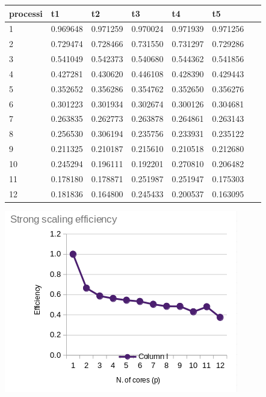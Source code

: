 \documentclass[a4paper,11pt, twoside]{report}
\begin{document}
\begin{table}[!ht]
    \centering
    \begin{tabular}{|l|l|l|l|l|l|l|}
    \hline
        processi & t1 & t2 & t3 & t4 & t5 & ~ \\ \hline
        1 & 0.969648 & 0.971259 & 0.970024 & 0.971939 & 0.971256 & ~ \\ \hline
        2 & 0.729474 & 0.728466 & 0.731550 & 0.731297 & 0.729286 & ~ \\ \hline
        3 & 0.541049 & 0.542373 & 0.540680 & 0.544362 & 0.541856 & ~ \\ \hline
        4 & 0.427281 & 0.430620 & 0.446108 & 0.428390 & 0.429443 & ~ \\ \hline
        5 & 0.352652 & 0.356286 & 0.354762 & 0.352650 & 0.356276 & ~ \\ \hline
        6 & 0.301223 & 0.301934 & 0.302674 & 0.300126 & 0.304681 & ~ \\ \hline
        7 & 0.263835 & 0.262773 & 0.263878 & 0.264861 & 0.263143 & ~ \\ \hline
        8 & 0.256530 & 0.306194 & 0.235756 & 0.233931 & 0.235122 & ~ \\ \hline
        9 & 0.211325 & 0.210187 & 0.215610 & 0.210518 & 0.212680 & ~ \\ \hline
        10 & 0.245294 & 0.196111 & 0.192201 & 0.270810 & 0.206482 & ~ \\ \hline
        11 & 0.178180 & 0.178871 & 0.251987 & 0.251947 & 0.175303 & ~ \\ \hline
        12 & 0.181836 & 0.164800 & 0.245433 & 0.200537 & 0.163095 & ~ \\ \hline
    \end{tabular}
\newline
\end{table}
\includegraphics[scale=0.5]{images/mpi_strong.png}
\end{document}
